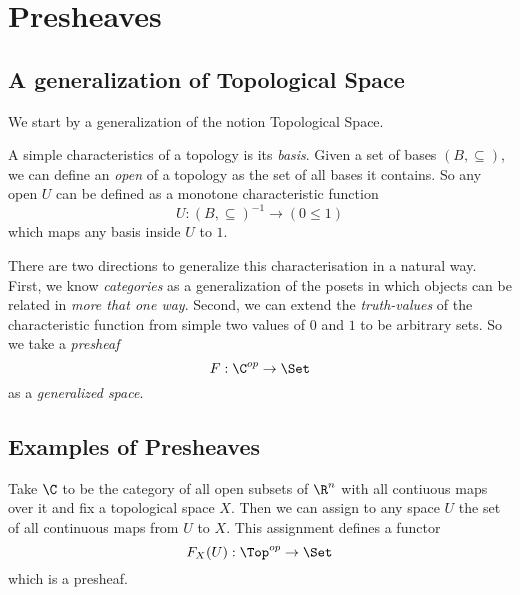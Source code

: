 \section{Presheaves}

\subsection{A generalization of Topological Space}
We start by a generalization of the notion Topological Space. 

A simple characteristics of a topology is its \emph{basis}. Given a set of bases $(B, \subseteq)$, we can define an \emph{open} of a topology as the set of all bases it contains. So any open $U$ can be defined as a monotone characteristic function
\[ U : (B, \subseteq)^{-1} \to (0 \le 1) \]
which maps any basis inside $U$ to $1$.

There are two directions to generalize this characterisation in a natural way. First, we know \emph{categories} as a generalization of the posets in which objects can be related in \emph{more that one way}. Second, we can extend the \emph{truth-values} of the characteristic function from simple two values of $0$ and $1$ to be arbitrary sets. So we take a \emph{presheaf}
\[ F : \C^{op} \to \Set\]
as a \emph{generalized space}.

\subsection{Examples of Presheaves}
\begin{exam}
  Take $\C$ to be the category of all open subsets of $\R^n$ with all contiuous maps over it and fix a topological space $X$. Then we can assign to any space $U$ the set of all continuous maps from $U$ to $X$. This assignment defines a functor
  \[ F_X(U) : \Top^{op} \to \Set \]
  which is a presheaf.
\end{exam}